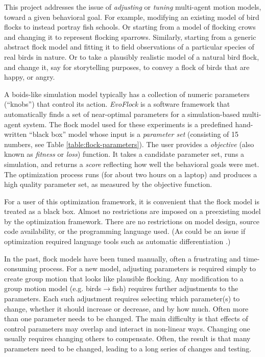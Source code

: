 \documentclass[letterpaper]{article}
\begin{document}
This project addresses the issue of \textit{adjusting} or \textit{tuning} multi-agent motion models, toward a given behavioral goal. For example, modifying an existing model of bird flocks to instead portray fish schools. Or starting from a model of flocking crows and changing it to represent flocking sparrows. Similarly, starting from a generic abstract flock model and fitting it to field observations of a particular species of real birds in nature. Or to take a plausibly realistic model of a natural bird flock, and change it, say for storytelling purposes, to convey a flock of birds that are happy, or angry. 

A boids-like simulation model typically has a collection of numeric parameters (``knobs'') that control its action. \textit{EvoFlock} is a software framework that automatically finds a set of near-optimal parameters for a simulation-based multi-agent system. The flock model used for these experiments is a predefined hand-written ``black box'' model whose input is a \textit{parameter set} (consisting of 15 numbers, see Table \ref{table:flock-parameters}). The user provides a \textit{objective} (also known as \textit{fitness} or \textit{loss}) function. It takes a candidate parameter set, runs a simulation, and returns a \textit{score} reflecting how well the behavioral goals were met. The optimization process runs (for about two hours on a laptop) and produces a high quality parameter set, as measured by the objective function.

For a user of this optimization framework, it is convenient that the flock model is treated as a black box. Almost no restrictions are imposed on a preexisting model by the optimization framework. There are no restrictions on model design, source code availability, or the programming language used. (As could be an issue if optimization required language tools such as automatic differentiation \citep{baydin_automatic_2018}.)

In the past, flock models have been tuned manually, often a frustrating and time-consuming process. For a new model, adjusting parameters is required simply to create group motion that looks like plausible flocking. Any modification to a group motion model (e.g. birds{$\rightarrow$}fish) requires further adjustments to the parameters. Each such adjustment requires selecting which parameter(s) to change, whether it should increase or decrease, and by how much. Often more than one parameter needs to be changed. The main difficulty is that effects of control parameters may overlap and interact in non-linear ways. Changing one usually requires changing others to compensate. Often, the result is that many parameters need to be changed, leading to a long series of changes and testing.
\end{document}
